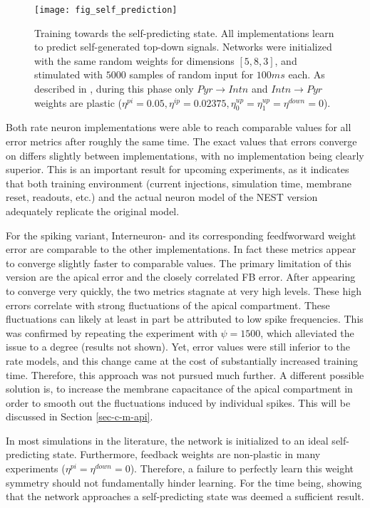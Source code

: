 \begin{figure}[h]
    \centering
    \texttt{[image: fig\_self\_prediction]}
    \caption[Training towards the self-predicting state]{Training towards the self-predicting state. All implementations
        learn to predict self-generated top-down signals. Networks were initialized with the same random weights for
        dimensions $[5, 8, 3]$, and stimulated with $5000$ samples of random input for $100ms$ each. As described in
        \citep{sacramento2018dendritic}, during this phase only $Pyr \rightarrow Intn$ and $Intn \rightarrow Pyr$
        weights are plastic ($\eta^{pi}=0.05, \eta^{ip}=0.02375, \eta^{up}_0=\eta^{up}_1=\eta^{down}=0$).}
    \label{fig-self-pred}
\end{figure}

Both rate neuron implementations were able to reach comparable values for all error metrics after roughly the same time.
The exact values that errors converge on differs slightly between implementations, with no implementation being clearly
superior. This is an important result for upcoming experiments, as it indicates that both training environment (current
injections, simulation time, membrane reset, readouts, etc.) and the actual neuron model of the NEST version adequately
replicate the original model.

For the spiking variant, Interneuron- and its corresponding feedfworward weight error are comparable to the other
implementations. In fact these metrics appear to converge slightly faster to comparable values. The primary limitation
of this version are the apical error and the closely correlated FB error. After appearing to converge very quickly, the
two metrics stagnate at very high levels. These high errors correlate with strong fluctuations of the apical
compartment. These fluctuations can likely at least in part be attributed to low spike frequencies. This was confirmed
by repeating the experiment with $\psi=1500$, which alleviated the issue to a degree (results not shown). Yet, error
values were still inferior to the rate models, and this change came at the cost of substantially increased training
time. Therefore, this approach was not pursued much further. A different possible solution is, to increase the membrane
capacitance of the apical compartment in order to smooth out the fluctuations induced by individual spikes. This will be
discussed in Section \ref{sec-c-m-api}.

In most simulations in the literature, the network is initialized to an ideal self-predicting state. Furthermore,
feedback weights are non-plastic in many experiments ($\eta^{pi}=\eta^{down}=0$). Therefore, a failure to perfectly
learn this weight symmetry should not fundamentally hinder learning. For the time being, showing that the network
approaches a self-predicting state was deemed a sufficient result.


